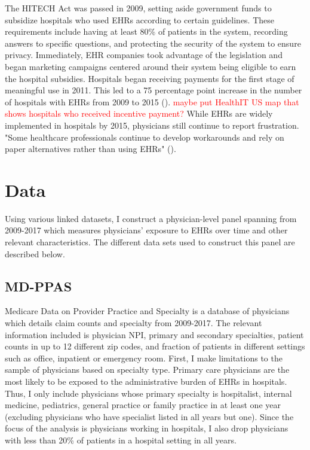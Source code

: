 \documentclass[11pt]{article}
\begin{document}
The HITECH Act was passed in 2009, setting aside government funds to subsidize hospitals who used EHRs according to certain guidelines. These requirements include having at least 80\% of patients in the system, recording answers to specific questions, and protecting the security of the system to ensure privacy. Immediately, EHR companies took advantage of the legislation and began marketing campaigns centered around their system being eligible to earn the hospital subsidies. Hospitals began receiving payments for the first stage of meaningful use in 2011. This led to a 75 percentage point increase in the number of hospitals with EHRs from 2009 to 2015 (\cite{stats}). \textcolor{red}{maybe put HealthIT US map that shows hospitals who received incentive payment?} While EHRs are widely implemented in hospitals by 2015, physicians still continue to report frustration. "Some healthcare professionals continue to develop workarounds and rely on paper alternatives rather than using EHRs" (\cite{evans2016electronic}).  

\section{Data}

Using various linked datasets, I construct a physician-level panel spanning from 2009-2017 which measures physicians' exposure to EHRs over time and other relevant characteristics. The different data sets used to construct this panel are described below.

\subsection{MD-PPAS}

Medicare Data on Provider Practice and Specialty is a database of physicians which details claim counts and specialty from 2009-2017. The relevant information included is physician NPI, primary and secondary specialties, patient counts in up to 12 different zip codes, and fraction of patients in different settings such as office, inpatient or emergency room. First, I make limitations to the sample of physicians based on specialty type. Primary care physicians are the most likely to be exposed to the administrative burden of EHRs in hospitals. Thus, I only include physicians whose primary specialty is hospitalist, internal medicine, pediatrics, general practice or family practice in at least one year (excluding physicians who have specialist listed in all years but one). Since the focus of the analysis is physicians working in hospitals, I also drop physicians with less than 20\% of patients in a hospital setting in all years.
\end{document}
